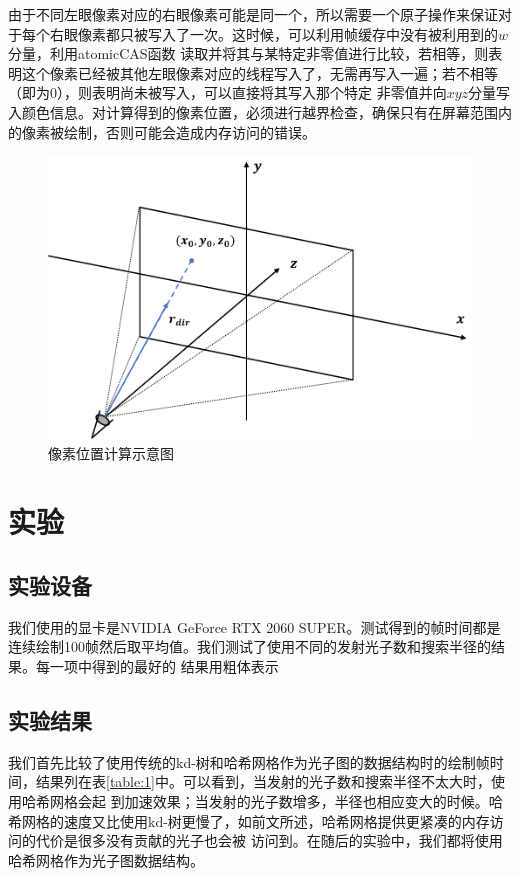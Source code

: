 \documentclass[UTF8]{ctexart}
\begin{document}
        由于不同左眼像素对应的右眼像素可能是同一个，所以需要一个原子操作来保证对于每个右眼像素都只被写入了一次。这时候，可以利用帧缓存中没有被利用到的$w$分量，利用atomicCAS函数
        读取并将其与某特定非零值进行比较，若相等，则表明这个像素已经被其他左眼像素对应的线程写入了，无需再写入一遍；若不相等（即为0），则表明尚未被写入，可以直接将其写入那个特定
        非零值并向$xyz$分量写入颜色信息。对计算得到的像素位置，必须进行越界检查，确保只有在屏幕范围内的像素被绘制，否则可能会造成内存访问的错误。
        
        \begin{figure}[htbp]
        \centering
        \includegraphics[scale=0.6]{pic/IndexCalculation.png}
        \caption{像素位置计算示意图}
        \label{fig:4}
        \end{figure}
\section{实验}
    \subsection{实验设备}
        我们使用的显卡是NVIDIA GeForce RTX 2060 SUPER。测试得到的帧时间都是连续绘制100帧然后取平均值。我们测试了使用不同的发射光子数和搜索半径的结果。每一项中得到的最好的
        结果用粗体表示
    \subsection{实验结果}
        我们首先比较了使用传统的kd-树和哈希网格作为光子图的数据结构时的绘制帧时间，结果列在表\ref{table:1}中。可以看到，当发射的光子数和搜索半径不太大时，使用哈希网格会起
        到加速效果；当发射的光子数增多，半径也相应变大的时候。哈希网格的速度又比使用kd-树更慢了，如前文所述，哈希网格提供更紧凑的内存访问的代价是很多没有贡献的光子也会被
        访问到。在随后的实验中，我们都将使用哈希网格作为光子图数据结构。
        
\end{document}
